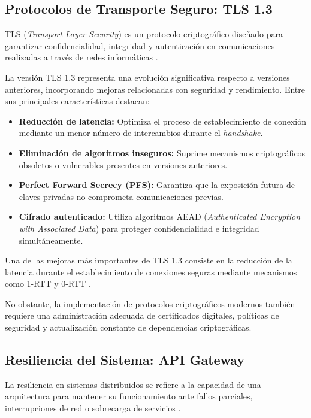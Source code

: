 \documentclass[12pt, oneside, letterpaper]{book}
\begin{document}
\subsection{Protocolos de Transporte Seguro: TLS 1.3}

TLS (\textit{Transport Layer Security}) es un protocolo criptográfico diseñado para garantizar confidencialidad, integridad y autenticación en comunicaciones realizadas a través de redes informáticas \cite{55}.

La versión TLS 1.3 representa una evolución significativa respecto a versiones anteriores, incorporando mejoras relacionadas con seguridad y rendimiento. Entre sus principales características destacan:

\begin{itemize}
\item \textbf{Reducción de latencia:} Optimiza el proceso de establecimiento de conexión mediante un menor número de intercambios durante el \textit{handshake}.

\item \textbf{Eliminación de algoritmos inseguros:} Suprime mecanismos criptográficos obsoletos o vulnerables presentes en versiones anteriores.

\item \textbf{Perfect Forward Secrecy (PFS):} Garantiza que la exposición futura de claves privadas no comprometa comunicaciones previas.

\item \textbf{Cifrado autenticado:} Utiliza algoritmos AEAD (\textit{Authenticated Encryption with Associated Data}) para proteger confidencialidad e integridad simultáneamente.
\end{itemize}

Una de las mejoras más importantes de TLS 1.3 consiste en la reducción de la latencia durante el establecimiento de conexiones seguras mediante mecanismos como 1-RTT y 0-RTT \cite{56}.

No obstante, la implementación de protocolos criptográficos modernos también requiere una administración adecuada de certificados digitales, políticas de seguridad y actualización constante de dependencias criptográficas.

\subsection{Resiliencia del Sistema: API Gateway}

La resiliencia en sistemas distribuidos se refiere a la capacidad de una arquitectura para mantener su funcionamiento ante fallos parciales, interrupciones de red o sobrecarga de servicios \cite{58}.
\end{document}
